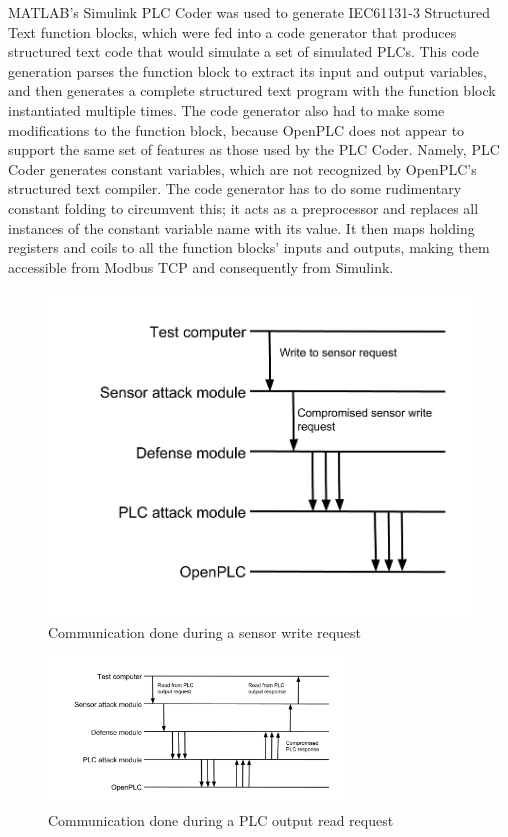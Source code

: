 \documentclass[10pt,twocolumn]{IEEEtran}
\begin{document}
MATLAB's Simulink PLC Coder was used to generate IEC61131-3 Structured Text function blocks, which were fed into a code generator that produces structured text code that would simulate a set of simulated PLCs.
This code generation parses the function block to extract its input and output variables, and then generates a complete structured text program with the function block instantiated multiple times.
The code generator also had to make some modifications to the function block, because OpenPLC does not appear to support the same set of features as those used by the PLC Coder.
Namely, PLC Coder generates constant variables, which are not recognized by OpenPLC's structured text compiler.
The code generator has to do some rudimentary constant folding to circumvent this; it acts as a preprocessor and replaces all instances of the constant variable name with its value.
It then maps holding registers and coils to all the function blocks' inputs and outputs, making them accessible from Modbus TCP and consequently from Simulink.

\begin{figure}
  \centering
  \includegraphics[width=\columnwidth]{csaw2017sensorwrite.png}
  \caption{Communication done during a sensor write request}
  \label{fig:write}
\end{figure}

\begin{figure}
  \centering
  \includegraphics[width=0.7\textwidth]{csaw2017plcread.png}
  \caption{Communication done during a PLC output read request}
  \label{fig:read}
\end{figure}
\end{document}
